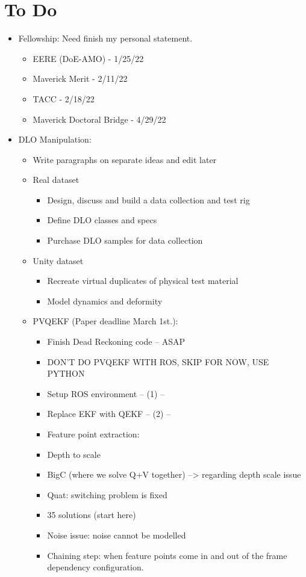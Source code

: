 \documentclass[11pt]{article}
\begin{document}
\section{To Do}
\begin{itemize}
  \item Fellowship: Need finish my personal statement.
  \begin{itemize}
      \item EERE (DoE-AMO) - 1/25/22
      \item Maverick Merit - 2/11/22
      \item TACC - 2/18/22
      \item Maverick Doctoral Bridge - 4/29/22
  \end{itemize}
  \item  DLO Manipulation:
  \begin{itemize}
      \item Write paragraphs on separate ideas and edit later
      \item Real dataset
      \begin{itemize}
            \item Design, discuss and build a data collection and test rig
            \item Define DLO classes and specs
            \item Purchase DLO samples for data collection
      \end{itemize}
      \item Unity dataset
      \begin{itemize}
            \item Recreate virtual duplicates of physical test material
            \item Model dynamics and deformity
  \end{itemize}
  \item PVQEKF (Paper deadline March 1st.):
  \begin{itemize}
      \item Finish Dead Reckoning code -- ASAP
      \item DON'T DO PVQEKF WITH ROS, SKIP FOR NOW, USE PYTHON
      \item Setup ROS environment -- (1) --
      \item Replace EKF with QEKF -- (2) --
      \item Feature point extraction:
      \item Depth to scale
      \item BigC (where we solve Q+V together) --> regarding depth scale issue
      \item Quat: switching problem is fixed
      \item 35 solutions (start here)
      \item Noise issue: noise cannot be modelled
      \item Chaining step: when feature points come in and out of the frame dependency configuration.
  \end{itemize}
\end{itemize}



\end{itemize}
\end{document}

